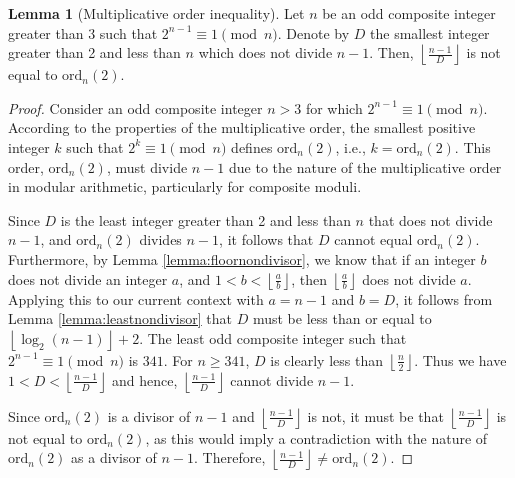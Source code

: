 \documentclass{article}
\theoremstyle{plain}
\theoremstyle{definition}
\newtheorem{lemma}{Lemma}
\begin{document}
\begin{lemma}[Multiplicative order inequality] \label{lemma:orderinequality}
    Let \( n \) be an odd composite integer greater than 3 such that \( 2^{n-1} \equiv 1 \pmod{n} \). Denote by \( D \) the smallest integer greater than 2 and less than \( n \) which does not divide \( n-1 \). Then, \( \left\lfloor\frac{n-1}{D}\right\rfloor \) is not equal to \( \text{ord}_n(2) \).
\end{lemma}
\begin{proof}
Consider an odd composite integer \( n > 3 \) for which \( 2^{n-1} \equiv 1 \pmod{n} \). According to the properties of the multiplicative order, the smallest positive integer \( k \) such that \( 2^k \equiv 1 \pmod{n} \) defines \( \text{ord}_n(2) \), i.e., \( k = \text{ord}_n(2) \). This order, \( \text{ord}_n(2) \), must divide \( n-1 \) due to the nature of the multiplicative order in modular arithmetic, particularly for composite moduli.

Since \( D \) is the least integer greater than 2 and less than \( n \) that does not divide \( n-1 \), and \( \text{ord}_n(2) \) divides \( n-1 \), it follows that \( D \) cannot equal \( \text{ord}_n(2) \). Furthermore, by Lemma \ref{lemma:floornondivisor}, we know that if an integer \( b \) does not divide an integer \( a \), and \( 1 < b < \left\lfloor \frac{a}{b} \right\rfloor \), then \( \left\lfloor \frac{a}{b} \right\rfloor \) does not divide \( a \). Applying this to our current context with \( a = n-1 \) and \( b = D \), it follows from Lemma \ref{lemma:leastnondivisor} that $D$ must be less than or equal to $\left\lfloor\log_2(n-1)\right\rfloor + 2$. The least odd composite integer such that \( 2^{n-1} \equiv 1 \pmod{n} \) is $341$. For $n \geq 341$, $D$ is clearly less than $\left\lfloor\frac{n}{2}\right\rfloor$. Thus we have \( 1 < D < \left\lfloor \frac{n-1}{D} \right\rfloor \) and hence, \( \left\lfloor \frac{n-1}{D} \right\rfloor \) cannot divide \( n-1 \).

Since \( \text{ord}_n(2) \) is a divisor of \( n-1 \) and \( \left\lfloor \frac{n-1}{D} \right\rfloor \) is not, it must be that \( \left\lfloor \frac{n-1}{D} \right\rfloor \) is not equal to \( \text{ord}_n(2) \), as this would imply a contradiction with the nature of \( \text{ord}_n(2) \) as a divisor of \( n-1 \). Therefore, \( \left\lfloor\frac{n-1}{D}\right\rfloor \not= \text{ord}_n(2) \).
\end{proof}
\end{document}
